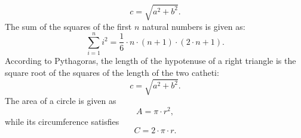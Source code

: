 \documentclass{article}
\begin{document}
$$ c = \sqrt{a^{2} + b^{2}}.  $$
The sum of the squares of the first $n$ natural numbers is given as:
$$ \sum\limits_{i=1}^{n} i^{2} = \frac{1}{6} \cdot n \cdot (n+1) \cdot (2\cdot n + 1). $$
According to Pythagoras, the length of the hypotenuse of a right triangle is
the square root of the squares of the length of the two catheti:
$$ c = \sqrt{a^{2} + b^{2}}.  $$
The area of a circle is given as 
$$  A = \pi \cdot r^{2},   $$ 
while its circumference satisfies
$$ C = 2 \cdot \pi \cdot r.  $$
\end{document}
